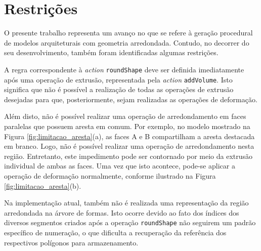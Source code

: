 \section{Restrições}
\label{sec:limitacoes}

O presente trabalho representa um avanço no que se refere à geração procedural de modelos arquiteturais com geometria arredondada. Contudo, no decorrer do seu desenvolvimento, também foram identificadas algumas restrições.

A regra correspondente à \textit{action} \texttt{roundShape} deve ser definida imediatamente após uma operação de extrusão, representada pela \textit{action} \texttt{addVolume}. Isto significa que não é possível a realização de todas as operações de extrusão desejadas para que, posteriormente, sejam realizadas as operações de deformação.

Além disto, não é possível realizar uma operação de arredondamento em faces paralelas que possuem aresta em comum. Por exemplo, no modelo mostrado na Figura \ref{fig:limitacao_aresta}(a), as faces A e B compartilham a aresta destacada em branco. Logo, não é possível realizar uma operação de arredondamento nesta região. Entretanto, este impedimento pode ser contornado por meio da extrusão individual de ambas as faces. Uma vez que isto acontece, pode-se aplicar a operação de deformação normalmente, conforme ilustrado na Figura \ref{fig:limitacao_aresta}(b).

\begin{figure}[h!]
	\centering
	\captionsetup{width=15cm}
	{}	
\end{figure}

Na implementação atual, também não é realizada uma representação da região arredondada na árvore de formas. Isto ocorre devido ao fato dos índices dos diversos segmentos criados após a operação \texttt{roundShape} não seguirem um padrão específico de numeração, o que dificulta a recuperação da referência dos respectivos polígonos para armazenamento.

